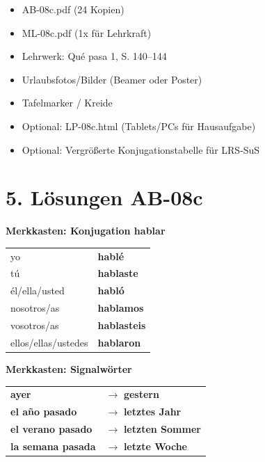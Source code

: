 \documentclass[11pt, a4paper]{article}
\newcommand{\fachfarbe}{spanisch}
\newcommand{\lerngruppengroesse}{24}
\newcommand{\loesung}[1]{\textcolor{loesung}{\textbf{#1}}}
\newcommand{\es}[1]{\textcolor{\fachfarbe}{\textbf{#1}}}
\begin{document}
\begin{materialbox}
\begin{itemize}[label=$\square$]
    \item AB-08c.pdf (\lerngruppengroesse{} Kopien)
    \item ML-08c.pdf (1x für Lehrkraft)
    \item Lehrwerk: Qué pasa 1, S. 140--144
    \item Urlaubsfotos/Bilder (Beamer oder Poster)
    \item Tafelmarker / Kreide
    \item Optional: LP-08c.html (Tablets/PCs für Hausaufgabe)
    \item Optional: Vergrößerte Konjugationstabelle für LRS-SuS
\end{itemize}
\end{materialbox}


\section*{5. Lösungen AB-08c}

\textbf{Merkkasten: Konjugation hablar}

\begin{tabular}{ll}
yo & \loesung{hablé} \\
tú & \loesung{hablaste} \\
él/ella/usted & \loesung{habló} \\
nosotros/as & \loesung{hablamos} \\
vosotros/as & \loesung{hablasteis} \\
ellos/ellas/ustedes & \loesung{hablaron} \\
\end{tabular}

\vspace{1em}

\textbf{Merkkasten: Signalwörter}

\begin{tabular}{ll}
\es{ayer} & $\rightarrow$ \loesung{gestern} \\
\es{el año pasado} & $\rightarrow$ \loesung{letztes Jahr} \\
\es{el verano pasado} & $\rightarrow$ \loesung{letzten Sommer} \\
\es{la semana pasada} & $\rightarrow$ \loesung{letzte Woche} \\
\end{tabular}
\end{document}

